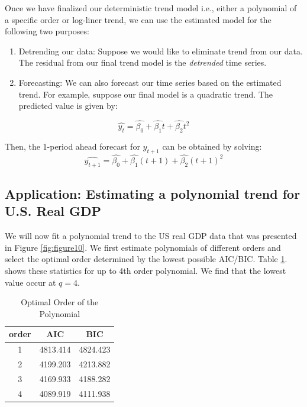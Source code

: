 \documentclass[]{book}
\theoremstyle{definition}
\theoremstyle{definition}
\theoremstyle{definition}
\theoremstyle{remark}
\begin{document}
Once we have finalized our deterministic trend model i.e., either a polynomial of a specific order or log-liner trend, we can use the estimated model for the following two purposes:

\begin{enumerate}
\def\labelenumi{\arabic{enumi}.}
\item
  Detrending our data: Suppose we would like to eliminate trend from our data. The residual from our final trend model is the \emph{detrended} time series.
\item
  Forecasting: We can also forecast our time series based on the estimated trend. For example, suppose our final model is a quadratic trend. The predicted value is given by:
\end{enumerate}

\begin{equation}
\widehat{y_t}=\widehat{\beta_0}+\widehat{\beta_1} t + \widehat{\beta_2} t^2
\end{equation}

Then, the 1-period ahead forecast for \(y_{t+1}\) can be obtained by solving:
\begin{equation}
\widehat{y_{t+1}}=\widehat{\beta_0}+\widehat{\beta_1} (t+1) + \widehat{\beta_2} (t+1)^2
\end{equation}

\hypertarget{application-estimating-a-polynomial-trend-for-u.s.-real-gdp}{%
\subsection{Application: Estimating a polynomial trend for U.S. Real GDP}\label{application-estimating-a-polynomial-trend-for-u.s.-real-gdp}}

We will now fit a polynomial trend to the US real GDP data that was presented in Figure \ref{fig:figure10}. We first estimate polynomials of different orders and select the optimal order determined by the lowest possible AIC/BIC. Table \ref{tab:ch5-table1}. shows these statistics for up to 4th order polynomial. We find that the lowest value occur at \(q=4\).

\begin{table}[t]

\caption{\label{tab:ch5-table1}Optimal Order of the Polynomial}
\centering
\begin{tabular}{ccc}
\toprule
order & AIC & BIC\\
\midrule
1 & 4813.414 & 4824.423\\
2 & 4199.203 & 4213.882\\
3 & 4169.933 & 4188.282\\
4 & 4089.919 & 4111.938\\
\bottomrule
\end{tabular}
\end{table}
\end{document}
